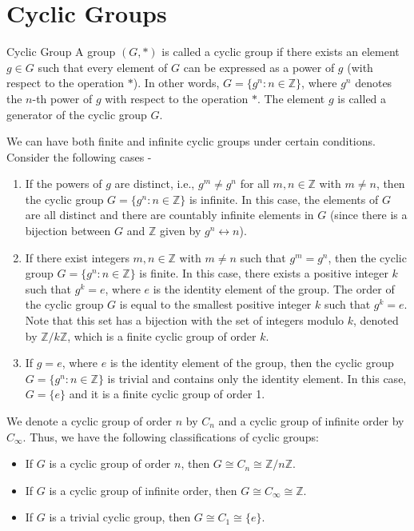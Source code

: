 \documentclass[openany]{book}
\begin{document}
\section{Cyclic Groups}
\begin{mydefinition}{Cyclic Group}
    A group \( (G, *) \) is called a cyclic group if there exists an element \( g \in G \) such that every element of \( G \) can be expressed as a power of \( g \) (with respect to the operation \( * \)). In other words, \( G = \{ g^n : n \in \mathbb{Z} \} \), where \( g^n \) denotes the \( n \)-th power of \( g \) with respect to the operation \( * \). The element \( g \) is called a generator of the cyclic group \( G \). 
\end{mydefinition}
We can have both finite and infinite cyclic groups under certain conditions. Consider the following cases - 
\begin{enumerate}
    \item {} If the powers of \( g \) are distinct, i.e., \( g^m \neq g^n \) for all \( m, n \in \mathbb{Z} \) with \( m \neq n \), then the cyclic group \( G = \{ g^n : n \in \mathbb{Z} \} \) is infinite. In this case, the elements of \( G \) are all distinct and there are countably infinite elements in \( G \) (since there is a bijection between \( G \) and \( \mathbb{Z} \) given by \( g^n \leftrightarrow n \)).
    \item {} If there exist integers \( m, n \in \mathbb{Z} \) with \( m \neq n \) such that \( g^m = g^n \), then the cyclic group \( G = \{ g^n : n \in \mathbb{Z} \} \) is finite. In this case, there exists a positive integer \( k \) such that \( g^k = e \), where \( e \) is the identity element of the group. The order of the cyclic group \( G \) is equal to the smallest positive integer \( k \) such that \( g^k = e \). Note that this set has a bijection with the set of integers modulo \( k \), denoted by \( \mathbb{Z}/k\mathbb{Z} \), which is a finite cyclic group of order \( k \).
    \item {} If \( g = e \), where \( e \) is the identity element of the group, then the cyclic group \( G = \{ g^n : n \in \mathbb{Z} \} \) is trivial and contains only the identity element. In this case, \( G = \{ e \} \) and it is a finite cyclic group of order 1.
\end{enumerate}
\begin{mynote}
    We denote a cyclic group of order \( n \) by \( C_n \) and a cyclic group of infinite order by \( C_\infty \). Thus, we have the following classifications of cyclic groups:
\begin{itemize}
    \item If \( G \) is a cyclic group of order \( n \), then \( G \cong C_n \cong \mathbb{Z}/n\mathbb{Z} \).
    \item If \( G \) is a cyclic group of infinite order, then \( G \cong C_\infty \cong \mathbb{Z} \). 
    \item If \( G \) is a trivial cyclic group, then \( G \cong C_1 \cong \{ e \} \).
\end{itemize}
\end{mynote}
\end{document}
